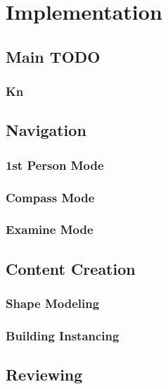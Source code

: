 \chapter{Implementation}


\section{Main TODO}

\subsection{Kn}


\section{Navigation}

\subsection{1st Person Mode}

\subsection{Compass Mode}

\subsection{Examine Mode}


\section{Content Creation}

\subsection{Shape Modeling}

\subsection{Building Instancing}


\section{Reviewing}


%

%

%

%

%

%

